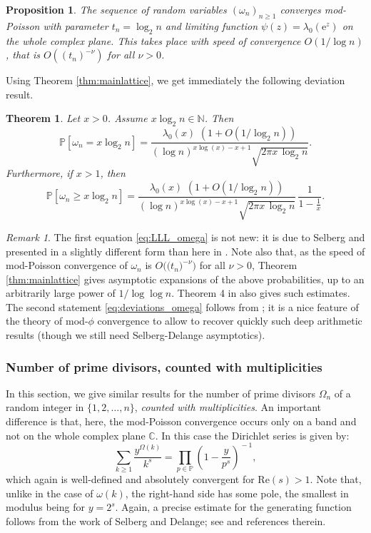 \documentclass[12pt,a4paper,reqno]{amsart}
\newtheorem{theorem}[lemma]{Theorem}
\newtheorem{proposition}[lemma]{Proposition}
\theoremstyle{remark}
\newtheorem{remark}[lemma]{Remark}
\newcommand{\N}{\mathbb{N}}
\newcommand{\C}{\mathbb{C}}
\newcommand{\E}{\mathrm{e}}
\newcommand{\proba}{\mathbb{P}}
\renewcommand{\Re}{\mathrm{Re}}
\begin{document}
\begin{proposition}
    The sequence of random variables $(\omega_n)_{ n \ge 1}$ converges mod-Poisson with parameter $t_n=\log_2 n$ and limiting function $\psi(z)=\lambda_0(\E^z)$ on the whole complex plane. This takes place with speed of convergence $O(1/\log n)$, that is $O((t_n)^{-\nu})$ for all $\nu >0$.
\end{proposition}

Using Theorem \ref{thm:mainlattice}, we get immediately the following deviation result.
\begin{theorem}
    Let $x>0$. Assume $x \log_2 n \in \N$. Then
    \begin{equation}
        \proba[\omega_n=x \log_2 n] =
        \frac{ \lambda_0(x)\,\,(1 +O(1/\log_2 n))}{(\log n)^{x \log(x)-x+1} \sqrt{2 \pi x\, \log_2 n}}.
    \label{eq:LLL_omega}
\end{equation}
    Furthermore, if $x>1$, then
    \begin{equation}
        \proba[\omega_n \ge x \log_2 n] =
        \frac{ \lambda_0(x)\,\,(1 +O(1/\log_2 n ))}{(\log n)^{x \log(x)-x+1} \sqrt{2 \pi x\, \log_2 n }} \,\frac{1}{1-\frac{1}{x}}.
    \label{eq:deviations_omega}
\end{equation}
\end{theorem}

\begin{remark}
The first equation \eqref{eq:LLL_omega} is not new: it is due to Selberg \cite{Selberg54} and presented in a slightly different form than here in \cite[Section II.6, Theorem 4]{Ten95}. Note also that, as the speed of mod-Poisson convergence of $\omega_n$ is $O\big(\big(t_n\big)^{-\nu}\big)$ for all $\nu >0$, Theorem \ref{thm:mainlattice} gives asymptotic expansions of the above probabilities, up to an arbitrarily large power of $1/\log\log n$. Theorem 4 in \cite[Section II.6]{Ten95} also gives such estimates. The second statement \eqref{eq:deviations_omega} follows from \cite[Theorem 2.8]{Rad09}; it is a nice feature of the theory of mod-$\phi$ convergence to allow to recover quickly such deep arithmetic results (though we still need Selberg-Delange asymptotics).
\end{remark}
\bigskip


\subsubsection{Number of prime divisors, counted with multiplicities}
In this section, we give similar results for the number of prime divisors $\Omega_n$ of a random integer in $\{1,2,\ldots,n\}$, {\em counted with multiplicities}. An important difference is that, here, the mod-Poisson convergence occurs only on a band and not on the whole complex plane $\C$. In this case the Dirichlet series is given by:
\[\sum_{k \ge 1} \frac{y^{\Omega(k)}}{k^s} = \prod_{p \in \mathbb{P}} \left( 1 - \frac{y}{p^s} \right)^{\!-1},\]
which again is well-defined and absolutely convergent for $\Re (s)>1$. Note that, unlike in the case of $\omega(k)$, the right-hand side has some pole, the smallest in modulus being for $y=2^s$. Again, a precise estimate for the generating function follows from the work of Selberg and Delange; see \cite{Ten95} and references therein.
\end{document}
